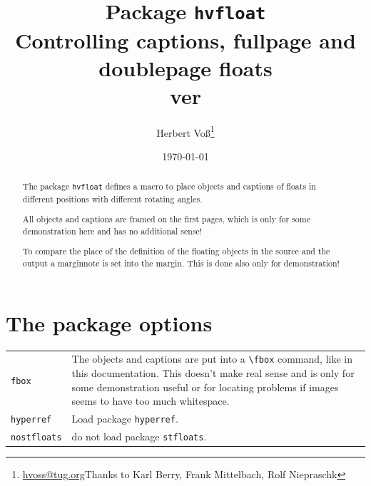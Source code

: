 \documentclass[twoside,paper=a4,usegeometry]{scrartcl}
\makeatletter
\def\Lcs#1{\texttt{\textbackslash#1}\index{#1@\texttt{\textbackslash#1}}}
\def\Lpack#1{\texttt{#1}\index{#1@\texttt{#1} (package)}}
\def\Loption#1{\texttt{#1}\index{#1@\texttt{#1} (package option)}}
\makeatother
\begin{document}
\title{Package \texttt{hvfloat}\\
Controlling captions, fullpage and doublepage floats\\ver \hvFloatFileVersion}
\author{Herbert Voß\thanks{\protect\url{hvoss@tug.org}\newline Thanks to Karl Berry, Frank Mittelbach, Rolf Niepraschk}}
\date{\today}
\maketitle



\begin{abstract}
The package \texttt{hvfloat} defines a macro to place objects and captions of floats in different 
positions with different rotating angles.

All objects and captions are framed on the first pages, which is only for some demonstration here and 
has no additional sense!

To compare the place of the definition of the floating objects in the source and the output a
marginnote  is set into the margin. This is done also only for demonstration!
\end{abstract}
\vfill


\vspace*{\fill}

\clearpage


\tableofcontents

\clearpage

\listoftables
\listoffigures


\clearpage
\section{The package options}

\noindent\begin{tabularx}{\textwidth}{lX}
\Loption{fbox} & The objects and captions are put into a \Lcs{fbox} command, like in 
this documentation. This doesn't make real sense and is only for some demonstration useful or for locating
problems if images seems to have too much whitespace.\\
\Loption{hyperref} & Load package \Lpack{hyperref}.\\
\Loption{nostfloats} & do not load package \Lpack{stfloats}.  
\end{tabularx}
\end{document}
